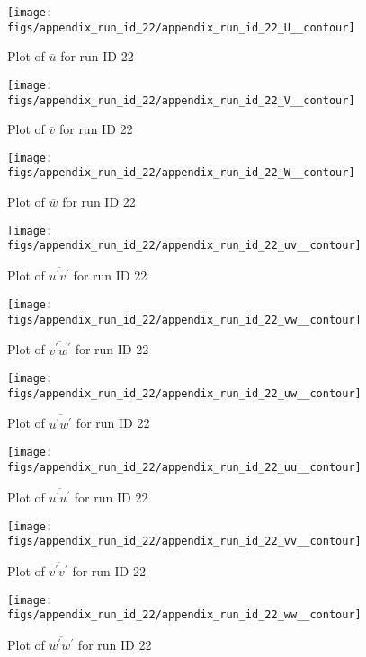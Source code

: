 \begin{figure}[H]
\centering
\texttt{[image: figs/appendix\_run\_id\_22/appendix\_run\_id\_22\_U\_\_contour]}
\caption{Plot of $\overline{u}$ for run ID 22}
\label{fig:appendix_run_id_22_U__contour}
\end{figure}


\begin{figure}[H]
\centering
\texttt{[image: figs/appendix\_run\_id\_22/appendix\_run\_id\_22\_V\_\_contour]}
\caption{Plot of $\overline{v}$ for run ID 22}
\label{fig:appendix_run_id_22_V__contour}
\end{figure}


\begin{figure}[H]
\centering
\texttt{[image: figs/appendix\_run\_id\_22/appendix\_run\_id\_22\_W\_\_contour]}
\caption{Plot of $\overline{w}$ for run ID 22}
\label{fig:appendix_run_id_22_W__contour}
\end{figure}


\begin{figure}[H]
\centering
\texttt{[image: figs/appendix\_run\_id\_22/appendix\_run\_id\_22\_uv\_\_contour]}
\caption{Plot of $\overline{u^\prime v^\prime}$ for run ID 22}
\label{fig:appendix_run_id_22_uv__contour}
\end{figure}


\begin{figure}[H]
\centering
\texttt{[image: figs/appendix\_run\_id\_22/appendix\_run\_id\_22\_vw\_\_contour]}
\caption{Plot of $\overline{v^\prime w^\prime}$ for run ID 22}
\label{fig:appendix_run_id_22_vw__contour}
\end{figure}


\begin{figure}[H]
\centering
\texttt{[image: figs/appendix\_run\_id\_22/appendix\_run\_id\_22\_uw\_\_contour]}
\caption{Plot of $\overline{u^\prime w^\prime}$ for run ID 22}
\label{fig:appendix_run_id_22_uw__contour}
\end{figure}


\begin{figure}[H]
\centering
\texttt{[image: figs/appendix\_run\_id\_22/appendix\_run\_id\_22\_uu\_\_contour]}
\caption{Plot of $\overline{u^\prime u^\prime}$ for run ID 22}
\label{fig:appendix_run_id_22_uu__contour}
\end{figure}


\begin{figure}[H]
\centering
\texttt{[image: figs/appendix\_run\_id\_22/appendix\_run\_id\_22\_vv\_\_contour]}
\caption{Plot of $\overline{v^\prime v^\prime}$ for run ID 22}
\label{fig:appendix_run_id_22_vv__contour}
\end{figure}


\begin{figure}[H]
\centering
\texttt{[image: figs/appendix\_run\_id\_22/appendix\_run\_id\_22\_ww\_\_contour]}
\caption{Plot of $\overline{w^\prime w^\prime}$ for run ID 22}
\label{fig:appendix_run_id_22_ww__contour}
\end{figure}


